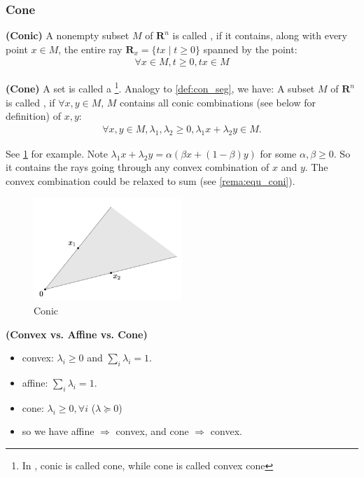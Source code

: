 \documentclass{article}
\newcommand{\bfs}[1]{\textbf{({#1}) }}
\begin{document}
\subsubsection{Cone}
\begin{defa}{\bfs{Conic}}
 A nonempty subset $M$ of $\mathbf{R}^{n}$ is called , if it contains, along with every point $x \in M$, the entire ray $\mathbf{R}_x=\{t x \mid t \geq 0\}$ spanned by the point:
\begin{align*}
\forall x \in M , t\ge 0,  tx \in M
\end{align*}
\end{defa}
\begin{defa}{\bfs{Cone}}
 A  set is called a \footnote{In \cite{boyd2004convex}, conic is called cone, while cone is called convex cone}. Analogy to \cref{def:con_seg}, we have: A subset $M$ of $\mathbf{R}^{n}$ is called , if $\forall x, y\in M$, $M$ contains all conic combinations (see below for definition) of $x,y$:
\begin{align*}
\forall x, y \in M, \lambda_1,\lambda_2\ge 0, \lambda_1 x+\lambda_2 y \in M.
\end{align*}
\end{defa}
\begin{rema}
See \cref{fig:cone} for  example. 
Note $\lambda_1 x+\lambda_2 y =\alpha(\beta x+(1-\beta)y)$ for some $\alpha,\beta\ge 0$. So it contains the rays going through any convex combination of $x$ and $y$. The convex combination could be relaxed to sum (see \cref{rema:equ_coni}). 
\end{rema}
\begin{figure}
    \centering
    \includegraphics[width=0.5\textwidth]{Figs/cone-min.png}
    \caption{Conic}
    \label{fig:cone}
\end{figure}
\begin{rema}{\bfs{Convex vs. Affine vs. Cone}}\label{rema:con_aff_cone} 
\begin{itemize}
    \item convex: $\lambda_i\ge 0$ and $\sum_i\lambda_i=1$.
    \item affine: $\sum_i\lambda_i=1$.
    \item cone: $\lambda_i\ge 0, \forall i$ ($\lambda \succeq 0$) 
    \item so we have affine $\Rightarrow$ convex, and cone $\Rightarrow$ convex.
\end{itemize}
\end{rema}
\end{document}
